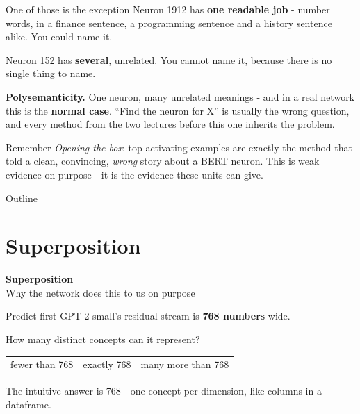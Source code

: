 \documentclass[aspectratio=169]{beamer}
\newcommand{\keybox}[1]{%
  \begin{tcolorbox}[colback=armblue!8, colframe=armblue, boxrule=0.6pt, arc=2pt]
  #1
  \end{tcolorbox}}
\newcommand{\sectiontransition}[2]{%
  \begin{frame}[plain]
    \vfill
    \begin{center}
      {\Huge\bfseries\color{popblue} #1}\\[1.1em]
      {\large #2}
    \end{center}
    \vfill
  \end{frame}}
\begin{document}
\begin{frame}{One of those is the exception}
  \vspace{0.7em}
  Neuron 1912 has \textbf{one readable job} - number words, in a finance sentence, a programming
  sentence and a history sentence alike. You could name it.

  \vspace{0.5em}
  Neuron 152 has \textbf{several}, unrelated. You cannot name it, because there is no single
  thing to name.

  \vspace{0.8em}
  \keybox{\textbf{Polysemanticity.} One neuron, many unrelated meanings - and in a real network
  this is the \textbf{normal case}. ``Find the neuron for X'' is usually the wrong question, and
  every method from the two lectures before this one inherits the problem.}

  \vspace{0.6em}
  {\footnotesize Remember \emph{Opening the box}: top-activating examples are exactly the method that told a
  clean, convincing, \emph{wrong} story about a BERT neuron. This is weak evidence on purpose -
  it is the evidence these units can give.}
\end{frame}

\begin{frame}{Outline}
  \tableofcontents
\end{frame}

\section{Superposition}
\sectiontransition{Superposition}{Why the network does this to us on purpose}

\begin{frame}{Predict first}
  \vspace{1.0em}
  GPT-2 small's residual stream is \textbf{768 numbers} wide.

  \vspace{1.3em}
  \begin{center}
    {\large How many distinct concepts can it represent?}
  \end{center}

  \vspace{1.3em}
  \begin{center}
  \small
  \begin{tabular}{@{}ccc@{}}
    fewer than 768 & exactly 768 & many more than 768\\
  \end{tabular}
  \end{center}

  \vspace{1.2em}
  \begin{center}
    {\footnotesize The intuitive answer is 768 - one concept per dimension, like columns in a
    dataframe.}
  \end{center}
\end{frame}
\end{document}

